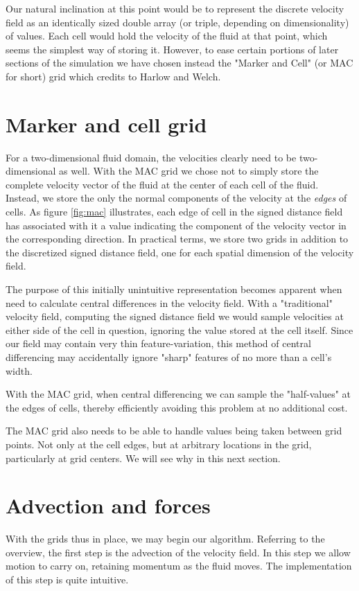Our natural inclination at this point would be to represent the
discrete velocity field as an identically sized double array (or triple,
depending on dimensionality) of values. Each cell would hold the
velocity of the fluid at that point, which seems the simplest way of
storing it. However, to ease certain portions of later sections of the
simulation we have chosen instead the "Marker and Cell" (or MAC for
short) grid which  credits to Harlow and Welch.

\section{Marker and cell grid}
For a two-dimensional fluid domain, the velocities clearly need to be
two-dimensional as well. With the MAC grid we chose not to simply
store the complete velocity vector of the fluid at the center of each
cell of the fluid. Instead, we store the only the normal components of
the velocity at the \textit{edges} of cells. As figure \vref{fig:mac} illustrates, each edge of
cell in the signed distance field has associated with it a value
indicating the component of the velocity vector in the corresponding
direction. In practical terms, we store two grids in addition to the
discretized signed distance field, one for each spatial dimension of
the velocity field.

The purpose of this initially unintuitive representation becomes
apparent when need to calculate central differences in the velocity
field. With a "traditional" velocity field, computing the signed
distance field we would sample velocities at either side of the cell
in question, ignoring the value stored at the cell itself. Since our
field may contain very thin feature-variation, this method of central
differencing may accidentally ignore "sharp" features of no more than
a cell's width.

With the MAC grid, when central differencing we can sample the
"half-values" at the edges of cells, thereby efficiently avoiding this
problem at no additional cost.

The MAC grid also needs to be able to handle values being taken
between grid points. Not only at the cell edges, but at arbitrary
locations in the grid, particularly at grid centers. We will see why
in this next section.

\section{Advection and forces}
With the grids thus in place, we may begin our algorithm. Referring to
the overview, the first step is the advection of the velocity
field. In this step we allow motion to carry on, retaining momentum as
the fluid moves. The implementation of this step is quite intuitive.

